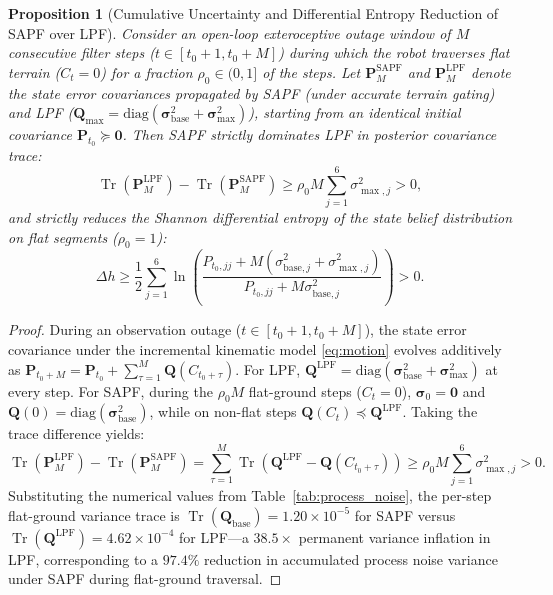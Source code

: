 \documentclass[11pt, a4paper]{article}
\newtheorem{proposition}{Proposition}
\begin{document}
\begin{proposition}[Cumulative Uncertainty and Differential Entropy Reduction of SAPF over LPF]
\label{prop:entropy}
Consider an open-loop exteroceptive outage window of $M$ consecutive filter steps ($t \in [t_0+1, t_0+M]$) during which the robot traverses flat terrain ($C_t = 0$) for a fraction $\rho_0 \in (0, 1]$ of the steps. Let $\mathbf{P}_M^{\text{SAPF}}$ and $\mathbf{P}_M^{\text{LPF}}$ denote the state error covariances propagated by SAPF (under accurate terrain gating) and LPF ($\mathbf{Q}_{\max} = \mathrm{diag}(\bm{\sigma}_{\text{base}}^2 + \bm{\sigma}_{\max}^2)$), starting from an identical initial covariance $\mathbf{P}_{t_0} \succeq \mathbf{0}$. Then SAPF strictly dominates LPF in posterior covariance trace:
\begin{equation}
\operatorname{Tr}(\mathbf{P}_M^{\text{LPF}}) - \operatorname{Tr}(\mathbf{P}_M^{\text{SAPF}}) \ge \rho_0 M \sum_{j=1}^6 \sigma_{\max,j}^2 > 0,
\end{equation}
and strictly reduces the Shannon differential entropy of the state belief distribution on flat segments ($\rho_0 = 1$):
\begin{equation}
\Delta h \ge \frac{1}{2}\sum_{j=1}^6 \ln\!\left(\frac{P_{t_0,jj} + M(\sigma_{\text{base},j}^2 + \sigma_{\max,j}^2)}{P_{t_0,jj} + M\sigma_{\text{base},j}^2}\right) > 0.
\end{equation}
\end{proposition}
\begin{proof}
During an observation outage ($t \in [t_0+1, t_0+M]$), the state error covariance under the incremental kinematic model \eqref{eq:motion} evolves additively as $\mathbf{P}_{t_0+M} = \mathbf{P}_{t_0} + \sum_{\tau=1}^M \mathbf{Q}(C_{t_0+\tau})$. For LPF, $\mathbf{Q}^{\text{LPF}} = \mathrm{diag}(\bm{\sigma}_{\text{base}}^2 + \bm{\sigma}_{\max}^2)$ at every step. For SAPF, during the $\rho_0 M$ flat-ground steps ($C_t = 0$), $\bm{\sigma}_0 = \mathbf{0}$ and $\mathbf{Q}(0) = \mathrm{diag}(\bm{\sigma}_{\text{base}}^2)$, while on non-flat steps $\mathbf{Q}(C_t) \preceq \mathbf{Q}^{\text{LPF}}$. Taking the trace difference yields:
\begin{equation}
\operatorname{Tr}(\mathbf{P}_M^{\text{LPF}}) - \operatorname{Tr}(\mathbf{P}_M^{\text{SAPF}}) = \sum_{\tau=1}^M \operatorname{Tr}\!\left(\mathbf{Q}^{\text{LPF}} - \mathbf{Q}(C_{t_0+\tau})\right) \ge \rho_0 M \sum_{j=1}^6 \sigma_{\max,j}^2 > 0.
\end{equation}
Substituting the numerical values from Table~\ref{tab:process_noise}, the per-step flat-ground variance trace is $\operatorname{Tr}(\mathbf{Q}_{\text{base}}) = 1.20 \times 10^{-5}$ for SAPF versus $\operatorname{Tr}(\mathbf{Q}^{\text{LPF}}) = 4.62 \times 10^{-4}$ for LPF—a $38.5\times$ permanent variance inflation in LPF, corresponding to a $97.4\%$ reduction in accumulated process noise variance under SAPF during flat-ground traversal.
\end{proof}
\end{document}
